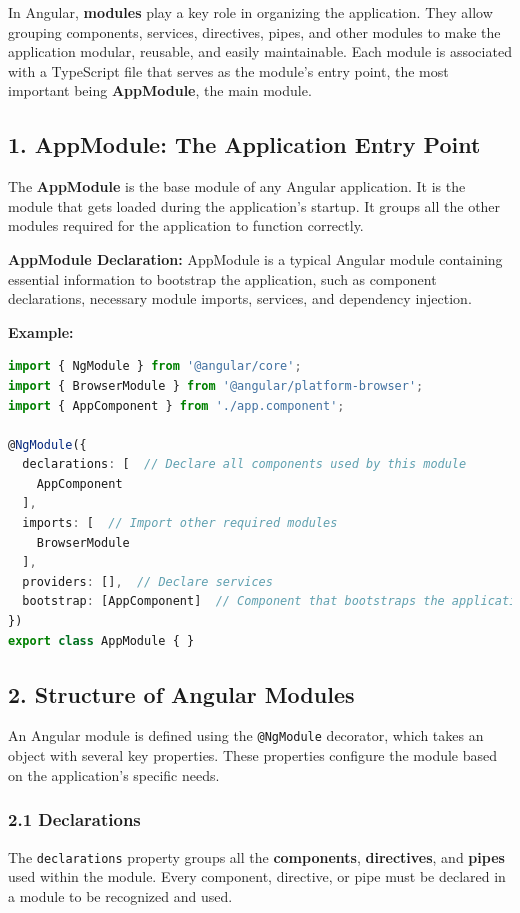 \documentclass{article}
\begin{document}
In Angular, \textbf{modules} play a key role in organizing the application. They allow grouping components, services, directives, pipes, and other modules to make the application modular, reusable, and easily maintainable. Each module is associated with a TypeScript file that serves as the module's entry point, the most important being \textbf{AppModule}, the main module.

\subsection*{1. AppModule: The Application Entry Point}

The \textbf{AppModule} is the base module of any Angular application. It is the module that gets loaded during the application's startup. It groups all the other modules required for the application to function correctly.

\textbf{AppModule Declaration:}  
AppModule is a typical Angular module containing essential information to bootstrap the application, such as component declarations, necessary module imports, services, and dependency injection.

\textbf{Example:}  
\begin{lstlisting}[language=TypeScript, caption={Using a service in a component}, label={lst:typescript-service-usage}]
import { NgModule } from '@angular/core';
import { BrowserModule } from '@angular/platform-browser';
import { AppComponent } from './app.component';

@NgModule({
  declarations: [  // Declare all components used by this module
    AppComponent
  ],
  imports: [  // Import other required modules
    BrowserModule
  ],
  providers: [],  // Declare services
  bootstrap: [AppComponent]  // Component that bootstraps the application
})
export class AppModule { }
\end{lstlisting}

\subsection*{2. Structure of Angular Modules}

An Angular module is defined using the \texttt{@NgModule} decorator, which takes an object with several key properties. These properties configure the module based on the application's specific needs.

\subsubsection*{2.1 Declarations}
The \texttt{declarations} property groups all the \textbf{components}, \textbf{directives}, and \textbf{pipes} used within the module. Every component, directive, or pipe must be declared in a module to be recognized and used.
\end{document}
